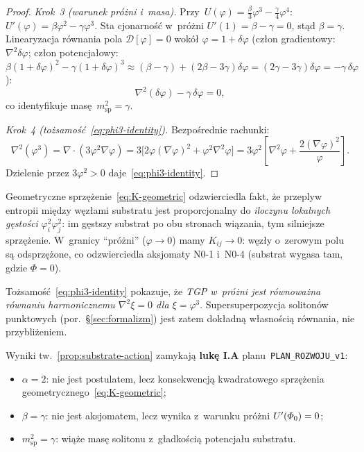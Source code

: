\begin{proof}
\emph{Krok~3 (warunek pr\'o\.zni i~masa).}
Przy~$U(\varphi) = \tfrac{\beta}{3}\varphi^3 - \tfrac{\gamma}{4}\varphi^4$:
$U'(\varphi) = \beta\varphi^2 - \gamma\varphi^3$.
Sta cjonarno\'s\'c w~pr\'o\.zni $U'(1) = \beta - \gamma = 0$,
st\k{a}d $\beta = \gamma$.
Linearyzacja r\'ownania pola $\mathcal{D}[\varphi] = 0$
wok\'o\l{} $\varphi = 1 + \delta\varphi$
(cz\l{}on gradientowy: $\nabla^2\delta\varphi$;
cz\l{}on potencja\l{}owy:
$\beta(1{+}\delta\varphi)^2 - \gamma(1{+}\delta\varphi)^3
\approx (\beta-\gamma) + (2\beta-3\gamma)\delta\varphi
= (2\gamma-3\gamma)\delta\varphi = -\gamma\,\delta\varphi$):
\begin{equation}
  \nabla^2(\delta\varphi) - \gamma\,\delta\varphi = 0,
\end{equation}
co identyfikuje mas\k{e}~$m_{\mathrm{sp}}^2 = \gamma$.

\emph{Krok~4 (to\.zsamo\'s\'c~\eqref{eq:phi3-identity}).}
Bezpo\'srednie rachunki:
\begin{equation}
  \nabla^2(\varphi^3)
  = \nabla\cdot(3\varphi^2\nabla\varphi)
  = 3\bigl[2\varphi(\nabla\varphi)^2 + \varphi^2\nabla^2\varphi\bigr]
  = 3\varphi^2\!\left[\nabla^2\varphi
    + \frac{2(\nabla\varphi)^2}{\varphi}\right].
\end{equation}
Dzielenie przez $3\varphi^2 > 0$ daje~\eqref{eq:phi3-identity}.
\end{proof}

\begin{remark}%
\label{rem:substrate-action-physics}
Geometryczne sprz\k{e}\.zenie~\eqref{eq:K-geometric} odzwierciedla
fakt, \.ze przepl{}yw entropii mi\k{e}dzy w\k{e}z\l{}ami substratu
jest proporcjonalny do \emph{iloczynu lokalnych g\k{e}sto\'sci}
$\varphi_i^2\varphi_j^2$: im g\k{e}stszy substrat po obu
stronach wi\k{a}zania, tym silniejsze sprz\k{e}\.zenie.
W~granicy ``pr\'o\.zni'' ($\varphi \to 0$) mamy $K_{ij} \to 0$:
w\k{e}z\l{}y o~zerowym polu s\k{a} odsprz\k{e}\.zone, co odzwierciedla
aksjomaty N0-1 i~N0-4 (substrat wygasa tam, gdzie $\Phi = 0$).

To\.zsamo\'s\'c~\eqref{eq:phi3-identity} pokazuje, \.ze
\emph{TGP w~pr\'o\.zni jest r\'ownowa\.zna r\'ownaniu harmonicznemu
$\nabla^2\xi = 0$ dla $\xi = \varphi^3$}.
Supersuperpozycja soliton\'ow punktowych
(por.\ \S\ref{sec:formalizm}) jest zatem dok\l{}adn\k{a} w\l{}asno\'sci\k{a}
r\'ownania, nie przybli\.zeniem.

Wyniki tw.~\ref{prop:substrate-action} zamykaj\k{a}
\textbf{luk\k{e} I.A} planu~\texttt{PLAN\_ROZWOJU\_v1}:
\begin{itemize}[nosep]
  \item $\alpha = 2$: nie jest postulatem, lecz konsekwencj\k{a}
    kwadratowego sprz\k{e}\.zenia geometrycznego~\eqref{eq:K-geometric};
  \item $\beta = \gamma$: nie jest aksjomatem, lecz wynika
    z~warunku pr\'o\.zni $U'(\varPhi_0) = 0$;
  \item $m_{\mathrm{sp}}^2 = \gamma$: wi\k{a}\.ze mas\k{e} solitonu
    z~g\l{}adko\'sci\k{a} potencja\l{}u substratu.
\end{itemize}
\end{remark}
